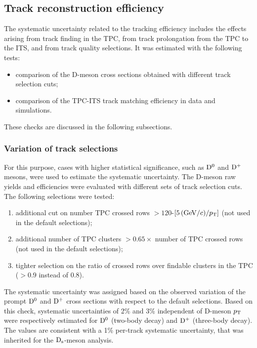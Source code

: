 \subsection{Track reconstruction efficiency}
\label{sec:TrackEffSystPP}
The systematic uncertainty related to the tracking efficiency includes the 
effects arising from track finding in the TPC, from track prolongation  
from the TPC to the ITS, and from track quality selections.
It was estimated with the following tests:
\begin{itemize}
\item comparison of the D-meson cross sections obtained with different track selection cuts;
\item comparison of the TPC-ITS track matching efficiency in data and simulations.
\end{itemize}
These checks are discussed in the following subsections.

\subsubsection{Variation of track selections}
\label{subsec:trackEffpp}
For this purpose, cases with higher statistical significance, such as ${\rm D^0}$ and ${\rm D^+}$ mesons,
 were used to estimate the systematic uncertainty.
The D-meson raw yields and efficiencies were evaluated with 
different sets of track selection cuts.
The following selections were tested:
\begin{enumerate}
\item additional cut on number TPC crossed rows $> 120$-$[5\, ( \mathrm{GeV}/c )/p_{\rm T}]$ (not used in the default selections);
\item additional number of TPC clusters $>0.65 \times$ number of TPC crossed rows (not used in the default selections);
\item tighter selection on the ratio of crossed rows over findable clusters in the TPC ($>0.9$ instead of 0.8).
\end{enumerate}
The systematic uncertainty was assigned based on the observed variation of
the prompt ${\rm D^0}$ and ${\rm D^+}$ cross sections with respect to the default selections.
Based on this check, systematic uncertainties of 2\% and 3\% independent of D-meson $p_{\rm T}$ were 
respectively estimated for ${\rm D^0}$ (two-body decay) and ${\rm D^+}$ (three-body decay). 
The values are consistent with a 1\% per-track systematic
uncertainty, that was inherited for the ${\rm D_s}$-meson analysis.

